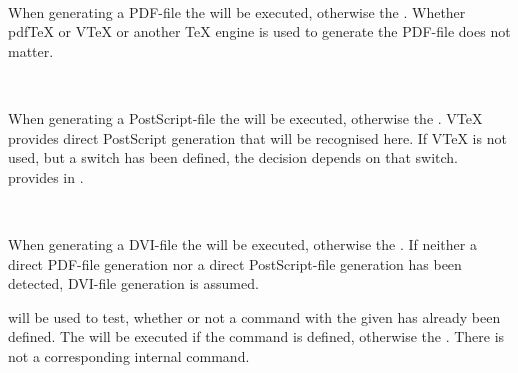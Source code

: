 \begin{Declaration}
  \\
\end{Declaration}
%
%
When generating a PDF-file the  will be executed,
otherwise the . Whether pdf\TeX{} or V\TeX{} or
another \TeX{} engine is used to generate the PDF-file does not matter.
%
%
%


\begin{Declaration}
  \\
\end{Declaration}
%
%
When generating a PostScript-file the  will be
executed, otherwise the . V\TeX{} provides direct
PostScript generation that will be recognised here. If V\TeX{} is not used,
but a switch  has been defined, the decision depends on that
switch. \KOMAScript{} provides  in .
%
%
%


\begin{Declaration}
  \\
\end{Declaration}
%
%
When generating a DVI-file the  will be executed,
otherwise the . If neither a direct PDF-file
generation nor a direct PostScript-file generation has been detected, DVI-file
generation is assumed.
%
%
%


\begin{Declaration}
\end{Declaration}
%
\eTeX{} will be used to test, whether or not a command with the given
 has already been defined. The  will be
executed if the command is defined, otherwise the . There is not a corresponding internal command.
%
%


